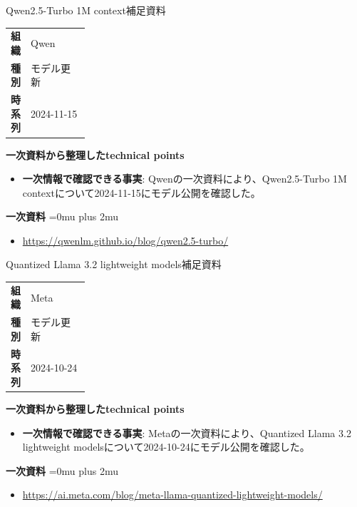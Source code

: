 \begin{technicalnote}{Qwen2.5-Turbo 1M context}{補足資料}
\begingroup
\begin{tabularx}{\linewidth}{@{}>{\bfseries}p{0.22\linewidth}X@{}}
組織 & Qwen \\
種別 & モデル更新 \\
時系列 & 2024-11-15 \\
\end{tabularx}
\smallskip
{\bfseries 一次資料から整理したtechnical points}
\begin{itemize}[leftmargin=1.5em,itemsep=0.35em]
\item \textbf{一次情報で確認できる事実}: Qwenの一次資料により、Qwen2.5-Turbo 1M contextについて2024-11-15にモデル公開を確認した。
\end{itemize}
\begin{minipage}{\linewidth}
\begin{samepage}
{\bfseries 一次資料}
\begingroup\sloppy
\Urlmuskip=0mu plus 2mu\relax
\begin{itemize}[leftmargin=1.5em,itemsep=0.25em]
\item {\scriptsize\url{https://qwenlm.github.io/blog/qwen2.5-turbo/}}
\end{itemize}
\endgroup
\end{samepage}
\end{minipage}
\endgroup
\end{technicalnote}
\medskip

\begin{technicalnote}{Quantized Llama 3.2 lightweight models}{補足資料}
\begingroup
\begin{tabularx}{\linewidth}{@{}>{\bfseries}p{0.22\linewidth}X@{}}
組織 & Meta \\
種別 & モデル更新 \\
時系列 & 2024-10-24 \\
\end{tabularx}
\smallskip
{\bfseries 一次資料から整理したtechnical points}
\begin{itemize}[leftmargin=1.5em,itemsep=0.35em]
\item \textbf{一次情報で確認できる事実}: Metaの一次資料により、Quantized Llama 3.2 lightweight modelsについて2024-10-24にモデル公開を確認した。
\end{itemize}
\begin{minipage}{\linewidth}
\begin{samepage}
{\bfseries 一次資料}
\begingroup\sloppy
\Urlmuskip=0mu plus 2mu\relax
\begin{itemize}[leftmargin=1.5em,itemsep=0.25em]
\item {\scriptsize\url{https://ai.meta.com/blog/meta-llama-quantized-lightweight-models/}}
\end{itemize}
\endgroup
\end{samepage}
\end{minipage}
\endgroup
\end{technicalnote}
\medskip
